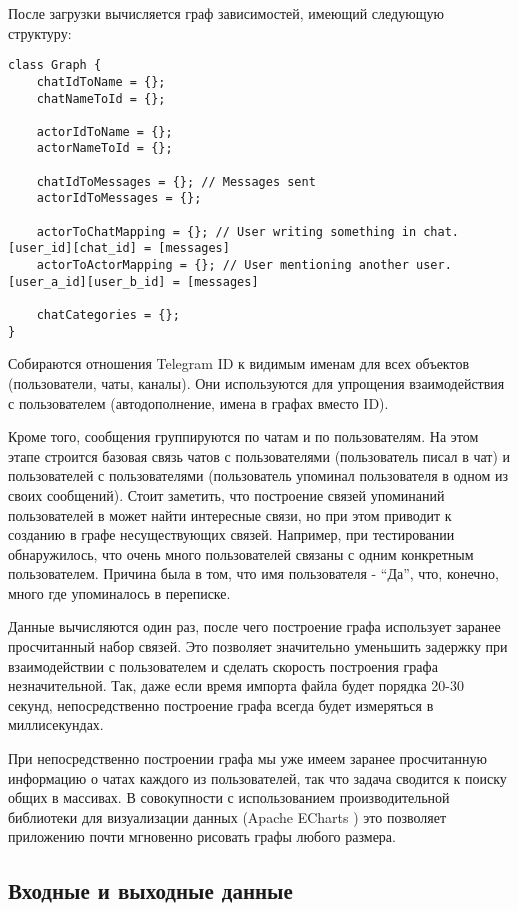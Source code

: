 После загрузки вычисляется граф зависимостей, имеющий следующую структуру:

\begin{lstlisting}
class Graph {
    chatIdToName = {};
    chatNameToId = {};

    actorIdToName = {};
    actorNameToId = {};

    chatIdToMessages = {}; // Messages sent
    actorIdToMessages = {};

    actorToChatMapping = {}; // User writing something in chat. [user_id][chat_id] = [messages]
    actorToActorMapping = {}; // User mentioning another user. [user_a_id][user_b_id] = [messages]

    chatCategories = {};
}
\end{lstlisting}

Собираются отношения Telegram ID к видимым именам для всех объектов (пользователи, чаты, каналы).
Они используются для упрощения взаимодействия с пользователем (автодополнение, имена в графах вместо ID).

Кроме того, сообщения группируются по чатам и по пользователям. 
На этом этапе строится базовая связь чатов с пользователями (пользователь писал в чат) и пользователей с пользователями (пользователь упоминал пользователя в одном из своих сообщений).
Стоит заметить, что построение связей упоминаний пользователей в может найти интересные связи, но при этом приводит к созданию в графе несуществующих связей.
Например, при тестировании обнаружилось, что очень много пользователей связаны с одним конкретным пользователем. Причина была в том, что имя пользователя - ``Да'', что, конечно, много где упоминалось в переписке.

Данные вычисляются один раз, после чего построение графа использует заранее просчитанный набор связей.
Это позволяет значительно уменьшить задержку при взаимодействии с пользователем и сделать скорость построения графа незначительной.
Так, даже если время импорта файла будет порядка 20-30 секунд, непосредственно построение графа всегда будет измеряться в миллисекундах.

При непосредственно построении графа мы уже имеем заранее просчитанную информацию о чатах каждого из пользователей, так что задача сводится к поиску общих в массивах.
В совокупности с использованием производительной библиотеки для визуализации данных (Apache ECharts \cite{echarts}) это позволяет приложению почти мгновенно рисовать графы любого размера. 

\subsection{Входные и выходные данные}

